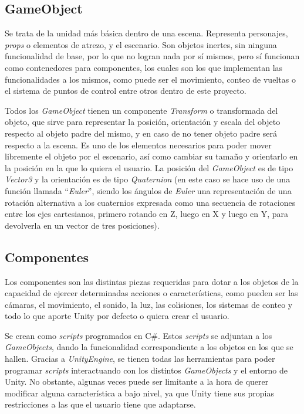 \subsection{GameObject}

Se trata de la unidad más básica dentro de una escena. Representa personajes, \textit{props} o elementos de atrezo, y el escenario. Son objetos inertes, sin ninguna funcionalidad de base, por lo que no logran nada por sí mismos, pero sí funcionan como contenedores para componentes, los cuales son los que implementan las funcionalidades a los mismos, como puede ser el movimiento, conteo de vueltas o el sistema de puntos de control entre otros dentro de este proyecto.

Todos los \textit{GameObject} tienen un componente \textit{Transform} o transformada del objeto, que sirve para representar la posición, orientación y escala del objeto respecto al objeto padre del mismo, y en caso de no tener objeto padre será respecto a la escena. Es uno de los elementos necesarios para poder mover libremente el objeto por el escenario, así como cambiar su tamaño y orientarlo en la posición en la que lo quiera el usuario. La posición del \textit{GameObject} es de tipo \textit{Vector3} y la orientación es de tipo \textit{Quaternion} (en este caso se hace uso de una función llamada ``\textit{Euler}'', siendo los ángulos de \textit{Euler} una representación de una rotación alternativa a los cuaternios expresada como una secuencia de rotaciones entre los ejes cartesianos, primero rotando en Z, luego en X y luego en Y, para devolverla en un vector de tres posiciones).

\subsection{Componentes}

Los componentes son las distintas piezas requeridas para dotar a los objetos de la capacidad de ejercer determinadas acciones o características, como pueden ser las cámaras, el movimiento, el sonido, la luz, las colisiones, los sistemas de conteo y todo lo que aporte Unity por defecto o quiera crear el usuario.

Se crean como \textit{scripts} programados en C\#. Estos \textit{scripts} se adjuntan a los \textit{GameObjects}, dando la funcionalidad correspondiente a los objetos en los que se hallen. Gracias a \textit{UnityEngine}, se tienen todas las herramientas para poder programar \textit{scripts} interactuando con los distintos \textit{GameObjects} y el entorno de Unity. No obstante, algunas veces puede ser limitante a la hora de querer modificar alguna característica a bajo nivel, ya que Unity tiene sus propias restricciones a las que el usuario tiene que adaptarse.

